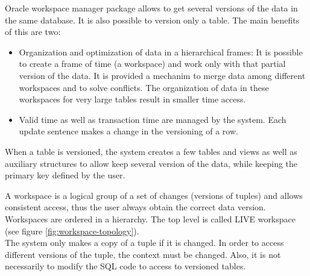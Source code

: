 Oracle workspace manager \cite{OraE118602} package allows to get several versions of the data in the same database. It is also possible to version only a table. The main benefits of this are two:

\begin{itemize}
\item
Organization and optimization of data in a hierarchical frames: It is possible to create a frame of time (a workspace) and work only with that partial version of the data. It is provided a mechanim to merge data among different workspaces and to solve conflicts. The organization of data in these workspaces for very large tables result in smaller time access.
\item
Valid time as well as transaction time are managed by the system. Each update sentence makes a change in the versioning of a row.
\end{itemize}

When a table is versioned, the system creates a few tables and views as well as auxiliary structures to allow keep several version of the data, while keeping the primary key defined by the user.

A workspace is a logical group of a set of changes (versions of tuples) and allows consistent access, thus the user always obtain the correct data version. Workspaces are ordered in a hierarchy. The top level is called LIVE workspace (see figure \ref{fig:workspace-topology}).  \\

The system only makes a copy of a tuple if it is changed. In order to access different versions of the tuple, the context must be changed. Also, it is not necessarily to modify the SQL code to access to versioned tables.\\

